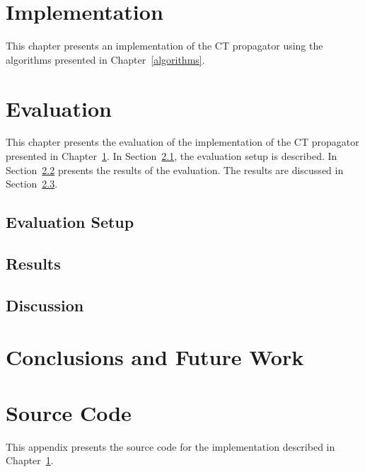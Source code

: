 \documentclass[a4paper,11pt]{article}
\newcommand{\Secref}[1]{Section~\ref{#1}}
\newcommand{\Chapref}[1]{Chapter~\ref{#1}}
\begin{document}
\section{Implementation}
\label{implementation}
This chapter presents an implementation of the CT propagator using the algorithms
presented in \Chapref{algorithms}.

\section{Evaluation}
\label{evaluation}
This chapter presents the evaluation of the implementation of the CT propagator
presented in \Chapref{implementation}. In \Secref{evaluation:setup},
the evaluation setup is described. In \Secref{evaluation:results} presents
the results of the evaluation. The results are discussed in \Secref{evaluation:discussion}.

\subsection{Evaluation Setup}
\label{evaluation:setup}
\subsection{Results}
\label{evaluation:results}
\subsection{Discussion}
\label{evaluation:discussion}

\section{Conclusions and Future Work}
\label{conclusions}




\appendix
\section{Source Code}
\label{source code}

This appendix presents the source code for the implementation described in \Chapref{implementation}.
\end{document}
